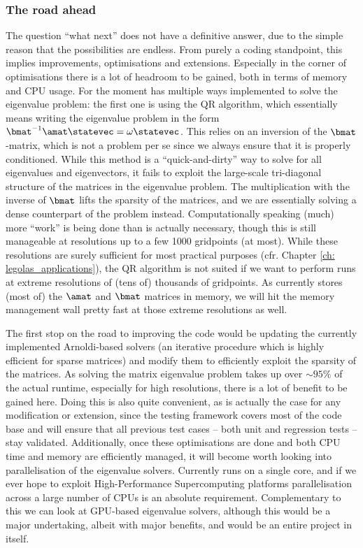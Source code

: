 \subsubsection{The road ahead}
The question ``what next'' does not have a definitive answer, due to the simple reason that the possibilities are endless. From purely a coding standpoint, this implies improvements, optimisations and extensions. Especially in the corner of optimisations there is a lot of headroom to be gained, both in terms of memory and CPU usage. For the moment {\legolas} has multiple ways implemented to solve the eigenvalue problem: the first one is using the QR algorithm, which essentially means writing the eigenvalue problem in the form $\bmat^{-1}\amat\statevec = \omega\statevec$. This relies on an inversion of the $\bmat$-matrix, which is not a problem per se since we always ensure that it is properly conditioned. While this method is a ``quick-and-dirty'' way to solve for all eigenvalues and eigenvectors, it fails to exploit the large-scale tri-diagonal structure of the matrices in the eigenvalue problem. The multiplication with the inverse of $\bmat$ lifts the sparsity of the matrices, and we are essentially solving a dense counterpart of the problem instead. Computationally speaking (much) more ``work'' is being done than is actually necessary, though this is still manageable at resolutions up to a few 1000 gridpoints (at most). While these resolutions are surely sufficient for most practical purposes (cfr. Chapter \ref{ch: legolas_applications}), the QR algorithm is not suited if we want to perform runs at extreme resolutions of (tens of) thousands of gridpoints. As {\legolas} currently stores (most of) the $\amat$ and $\bmat$ matrices in memory, we will hit the memory management wall pretty fast at those extreme resolutions as well.

The first stop on the road to improving the code would be updating the currently implemented Arnoldi-based solvers (an iterative procedure which is highly efficient for sparse matrices) and modify them to efficiently exploit the sparsity of the matrices. As solving the matrix eigenvalue problem takes up over $\sim 95\%$ of the actual runtime, especially for high resolutions, there is a lot of benefit to be gained here. Doing this is also quite convenient, as is actually the case for any modification or extension, since the testing framework covers most of the code base and will ensure that all previous test cases -- both unit and regression tests -- stay validated. Additionally, once these optimisations are done and both CPU time and memory are efficiently managed, it will become worth looking into parallelisation of the eigenvalue solvers. Currently {\legolas} runs on a single core, and if we ever hope to exploit High-Performance Supercomputing platforms parallelisation across a large number of CPUs is an absolute requirement. Complementary to this we can look at GPU-based eigenvalue solvers, although this would be a major undertaking, albeit with major benefits, and would be an entire project in itself.

